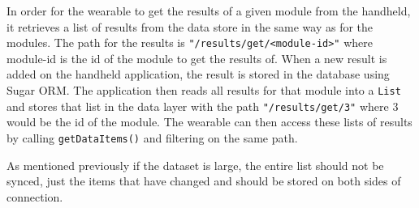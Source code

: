 In order for the wearable to get the results of a given module from the
handheld, it retrieves a list of results from the data store in the same way
as for the modules. The path for the results is
\texttt{"/results/get/<module-id>"} where module-id is the id of the module to
get the results of. When a new result is added on the handheld application, the
result is stored in the database using Sugar ORM. The application then reads all
results for that module into a \texttt{List} and stores that list in the data
layer with the path \texttt{"/results/get/3"} where 3 would be the id of the
module. The wearable can then access these lists of results by calling
\texttt{getDataItems()} and filtering on the same path.

As mentioned previously if the dataset is large, the entire list should not be
synced, just the items that have changed and should be stored on both sides of
connection.

